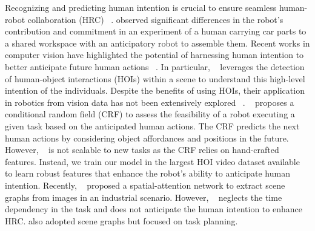 \documentclass{article}
\begin{document}
Recognizing and predicting human intention is crucial to ensure seamless human-robot collaboration (HRC) ~\citep{hoffman5, GARCIA2020315,hri_intention, hri_intention2}. \citep{hoffman5} observed significant differences in the robot's contribution and commitment in an experiment of a human carrying car parts to a shared workspace with an anticipatory robot to assemble them.  Recent works in computer vision have highlighted the potential of harnessing human intention to better anticipate future human actions ~\citep{Mascaro_2023_WACV, IntentionBasura, IntentionRobots}.  In particular, ~\citep{IntentionRobots} leverages the detection of human-object interactions (HOIs) within a scene to understand this high-level intention of the individuals. Despite the benefits of using HOIs, their application in robotics from vision data has not been extensively explored ~\citep{hri1}. ~\citep{Koppula2016} proposes a conditional random field (CRF) to assess the feasibility of a robot executing a given task based on the anticipated human actions. The CRF predicts the next human actions by considering object affordances and positions in the future. However, ~\citep{Koppula2016} is not scalable to new tasks as the CRF relies on hand-crafted features. Instead, we train our model in the largest HOI video dataset available to learn robust features that enhance the robot's ability to anticipate human intention. Recently, ~\citep{scene_graph_hoi} proposed a spatial-attention network to extract scene graphs from images in an industrial scenario. However, ~\citep{scene_graph_hoi} neglects the time dependency in the task and does not anticipate the human intention to enhance HRC.  \citep{scengraph_robotplan1, scengraph_robotplan2, scengraph_robotplan3} also adopted scene graphs but focused on task planning.
\end{document}
